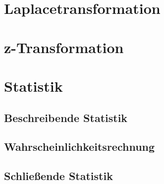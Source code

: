 \documentclass[12pt, a4paper]{scrartcl}
\begin{document}
\section{Laplacetransformation}

\section{z-Transformation}

\section{Statistik}

\subsection{Beschreibende Statistik}
\subsection{Wahrscheinlichkeitsrechnung}
\subsection{Schließende Statistik}
\end{document}
